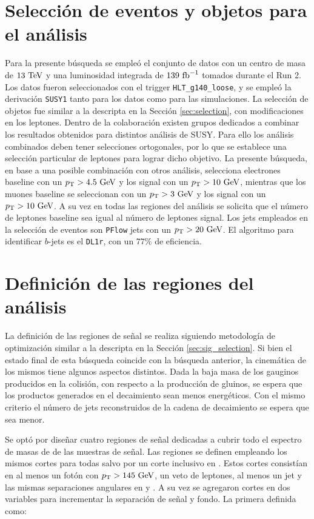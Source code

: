 \section{Selección de eventos y objetos para el análisis}

Para la presente búsqueda se empleó el conjunto de datos con un centro de masa de $13\ \text{TeV}$ y una luminosidad integrada de $139\ \text{fb}^{-1}$ tomados durante el Run 2. Los datos fueron seleccionados con el trigger \texttt{HLT\_g140\_loose}, y se empleó la derivación \texttt{SUSY1} tanto para los datos como para las simulaciones. La selección de objetos fue similar a la descripta en la Sección \ref{sec:selection}, con modificaciones en los leptones. Dentro de la colaboración existen grupos dedicados a combinar los resultados obtenidos para distintos análisis de SUSY. Para ello los análisis combinados deben tener selecciones ortogonales, por lo que se establece una selección particular de leptones para lograr dicho objetivo. La presente búsqueda, en base a una posible combinación con otros análisis, selecciona electrones baseline con un $p_{\text{T}}>4.5\ \text{GeV}$ y los signal con un $\pt>10 \ \gev$, mientras que los muones baseline se seleccionan con un $\pt>3\ \gev$ y los signal con un $\pt>10\ \gev$. A su vez en todas las regiones del análisis se solicita que el número de leptones baseline sea igual al número de leptones signal. Los jets empleados en la selección de eventos son \texttt{PFlow} jets con un $\pt>20\ \gev$. El algoritmo para identificar $b$-jets es el \texttt{DL1r}, con un $77\%$ de eficiencia.



\section{Definición de las regiones del análisis}

La definición de las regiones de señal se realiza siguiendo metodología de optimización similar a la descripta en la Sección \ref{sec:sig_selection}.
Si bien el estado final de esta búsqueda coincide con la búsqueda anterior, la cinemática de los mismos tiene algunos aspectos distintos. Dada la baja masa de los gauginos producidos en la colisión, con respecto a la producción de gluinos, se espera que los productos generados en el decaimiento sean menos energéticos. Con el mismo criterio el número de jets reconstruidos de la cadena de decaimiento se espera que sea menor.

Se optó por diseñar cuatro regiones de señal dedicadas a cubrir todo el espectro de masas de \ninoone de las muestras de señal. Las regiones se definen empleando los mismos cortes para todas salvo por un corte inclusivo en \met. Estos cortes consistían en al menos un fotón con $p_{\text{T}}>145\ \text{GeV}$, un veto de leptones, al menos un jet y las mismas separaciones angulares en \dphijetmet y \dphigammet. A su vez se agregaron cortes en dos variables para incrementar la separación de señal y fondo. La primera definida como:

